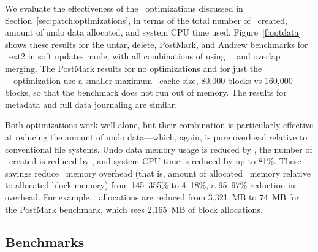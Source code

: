 \opttable{}

We evaluate the effectiveness of the \patch\ optimizations discussed in
Section~\ref{sec:patch:optimizations}, in terms of
%
the total number of \patches\ created, amount of undo data allocated,
and system CPU time used.
%
Figure~\ref{f:optdata} shows these results for the untar, delete,
PostMark, and Andrew benchmarks for \Kudos\ ext2 in soft updates mode,
with all combinations of using \nrb\ \patches\ and overlap merging.
%
The PostMark results for no optimizations and for just the \nrb\
\patches\ optimization use a smaller maximum \Kudos\ cache size,
80,000 blocks vs 160,000 blocks, so that the benchmark does not run
out of memory.
%
The results for metadata and full data journaling are similar.

Both optimizations work well alone, but their combination is particularly
effective at reducing the amount of undo data---which, again, is pure
overhead relative to conventional file systems.
%
Undo data memory usage is reduced by \patchoptundo,
%
the number of \patches\ created is reduced by \patchoptcount,
%
and system CPU time is reduced by up to 81\%.
%
These savings reduce \Kudos\ memory overhead (that is, amount of
allocated \Kudos\ memory relative to allocated block memory)
%
from 145--355\% to 4--18\%, a 95--97\% reduction in overhead. For
example, \Kudos\ allocations are reduced from 3,321~MB to 74~MB for
the PostMark benchmark, which sees 2,165~MB of block allocations.


\begin{comment}
\begin{figure}[t]
\vspace{-0.5\baselineskip}
\centering{
\texttt{[image: rb\_patch\_size]}
}
\vspace{-0.5\baselineskip}
\caption{\label{fig:patchsize-histo} \Rb\ \patch\ size histogram for a sample
workload (extracting a large archive into ext2). All the \patches\ larger than
63 bytes have been optimized into \nrb\ \patches. \Rb\ \patches\ 4 bytes and
smaller account for about 51\% of all \rb\ \patches.}
\end{figure}
\end{comment}

\subsection {Benchmarks}
\label{sec:eval:bench}

